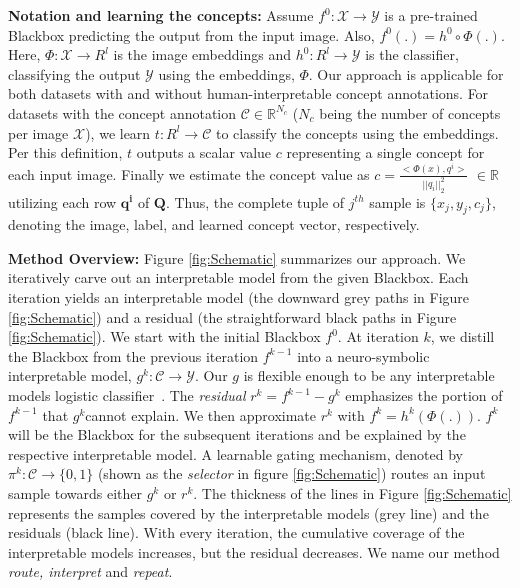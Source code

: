 
\textbf{Notation and learning the concepts:} 
Assume $f^0: \mathcal{X} \rightarrow \mathcal{Y}$ is a pre-trained Blackbox predicting the output from the input image. Also, $\displaystyle f^0(.) =  h^0 \circ \Phi(.) $. Here, $ \Phi: \mathcal{X} \rightarrow R^l $ is the image embeddings and $ h^0: R^l \rightarrow \mathcal{Y}$ is the classifier, classifying the output $\mathcal{Y}$ using the embeddings, $\Phi$. Our approach is applicable for both datasets with and without human-interpretable concept annotations. For datasets with the concept annotation $\mathcal{C} \in \mathbb{R}^{N_c}$ ($N_c$ being the number of concepts per image $\mathcal{X}$), we learn $t: R^l \rightarrow\mathcal{C}$ to classify the concepts using the embeddings. Per this definition, $t$ outputs a scalar value $c$ representing a single concept for each input image. 
Finally we estimate the concept value as $c = \frac{<\Phi(x), q^i>}{||q_i||_2^2}$ $ \in \mathbb{R}$ utilizing each row $\boldsymbol{q^i}$ of $\boldsymbol{Q}$. Thus, the complete tuple of $j^{th}$ sample is $\{x_j, y_j, c_j\}$, denoting the image, label, and learned concept vector, respectively.

\textbf{Method Overview:} 
Figure \ref{fig:Schematic} summarizes our approach. We iteratively carve out an interpretable model from the given Blackbox. Each iteration yields an interpretable model (the downward grey paths in Figure \ref{fig:Schematic}) and a residual (the straightforward black paths in Figure \ref{fig:Schematic}).
We start with the initial Blackbox $f^0$.
At iteration $k$, we distill the Blackbox from the previous iteration $f^{k-1}$ into a neuro-symbolic interpretable model, $\displaystyle g^{k}: \mathcal{C} \rightarrow \mathcal{Y}$. Our $g$ is flexible enough to be any interpretable models \eg logistic classifier~\cite{yuksekgonul2022post, koh2020concept, barbiero2022entropy}. The \emph{residual} $r^k =f^{k-1} - g^k$ emphasizes the portion of $f^{k-1}$ that $g^k$cannot explain. We then approximate $r^k$ with $f^{k} = h^k(\Phi(.))$. $f^k$ will be the Blackbox for the subsequent iterations and be explained by the respective interpretable model. 
A learnable gating mechanism, denoted by $\pi^k : \mathcal{C} \rightarrow \{0,1\}$ (shown as the \emph{selector} in figure \ref{fig:Schematic}) routes an input sample towards either $g^k$ or $r^k$.
The thickness of the lines in Figure \ref{fig:Schematic} represents the samples covered by the interpretable models (grey line) and the residuals (black line). 
With every iteration, the cumulative coverage of the interpretable models increases, but the residual decreases. We name our method \emph{route, interpret} and \emph{repeat}.

